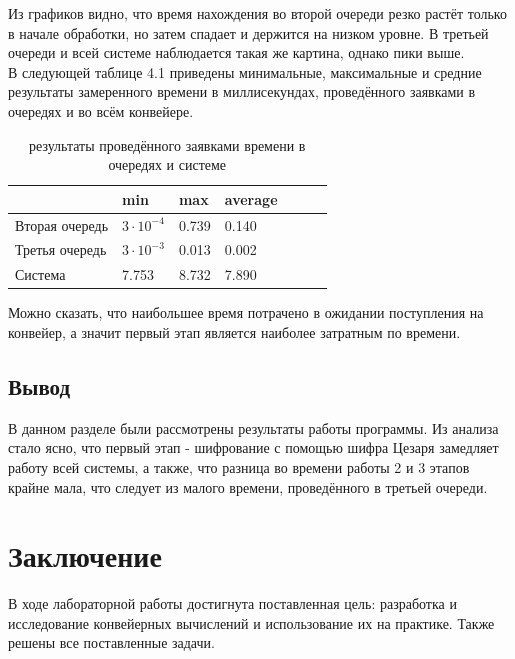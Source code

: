 \documentclass[12pt,a4paper]{report}
\begin{document}
Из графиков видно, что время нахождения во второй очереди резко растёт только в начале обработки, но затем 
спадает и держится на низком уровне.
В третьей очереди и всей системе наблюдается такая же картина, однако пики выше.\\

\newpage
В следующей таблице 4.1 приведены минимальные, максимальные и средние результаты замеренного времени в миллисекундах, 
проведённого заявками в очередях и во всём конвейере.

\begin{table}[h!]
\caption{результаты проведённого заявками времени в очередях и системе}
\label{tabular:timesandtenses}
\begin{center}
\begin{tabular}{ | l | l | l | l | l | l | l | }
\hline
                   & min               & max   & average \\ \hline
    Вторая очередь & $3 \cdot 10^{-4}$ & 0.739 & 0.140   \\ \hline
    Третья очередь & $3 \cdot 10^{-3}$ & 0.013 & 0.002   \\ \hline
    Система        & 7.753             & 8.732 & 7.890   \\ \hline
\end{tabular}
\end{center}
\end{table}

Можно сказать, что наибольшее время потрачено в ожидании поступления на конвейер, а значит первый этап 
является наиболее затратным по времени.

\section{Вывод}

В данном разделе были рассмотрены результаты работы программы.
Из анализа стало ясно, что первый этап - шифрование с помощью шифра Цезаря замедляет работу всей системы, 
а также, что разница во времени работы 2 и 3 этапов крайне мала, что следует из малого времени, проведённого 
в третьей очереди.

\newpage
\chapter*{Заключение}

В ходе лабораторной работы достигнута поставленная цель: разработка и исследование конвейерных вычислений и 
использование их на практике. 
Также решены все поставленные задачи.
\end{document}
